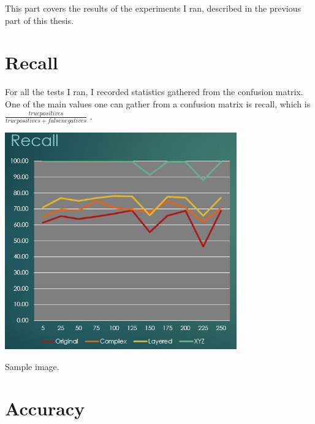 \documentclass[]{report}
\begin{document}
This part covers the results of the experiments I ran, described in the previous part of this thesis.

\section{Recall}

For all the tests I ran, I recorded statistics gathered from the confusion matrix. One of the main values one can gather from a confusion matrix is recall, which is $\frac{truepositives}{truepositives + falsenegatives} $ \cite{ThreeGiants}.


\begin{minipage}{\linewidth}
	\begin{minipage}{0.49\textwidth}
		\centering
		\includegraphics[width=0.75\textwidth]{../images/recall}
	\end{minipage}
	\hfill
	\begin{minipage}{0.49\textwidth}
		\centering
		Sample image.
	\end{minipage}
\end{minipage}

\section{Accuracy}
\end{document}
